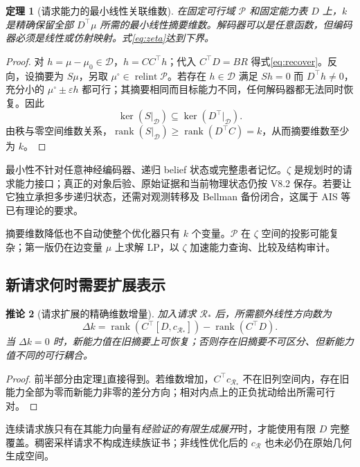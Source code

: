 \documentclass[UTF8,11pt,a4paper,fontset=fandol]{ctexart}
\numberwithin{equation}{section}
\newtheorem{theorem}{定理}[section]
\newtheorem{corollary}[theorem]{推论}
\theoremstyle{definition}
\DeclareMathOperator{\rank}{rank}
\begin{document}
\begin{theorem}[请求能力的最小线性关联维数]
\label{thm:minsummary}
在固定可行域 $\mathcal P$ 和固定能力表 $D$ 上，$k$ 是精确保留全部 $D^\top\mu$ 所需的最小线性摘要维数。解码器可以是任意函数，但编码器必须是线性或仿射映射。式\eqref{eq:zeta}达到下界。
\end{theorem}
\begin{proof}
对 $h=\mu-\mu_0\in\mathcal D$，$h=CC^\top h$；代入 $C^\top D=BR$ 得式\eqref{eq:recover}。反向，设摘要为 $S\mu$，另取 $\mu^\circ\in\operatorname{relint}\mathcal P$。若存在 $h\in\mathcal D$ 满足 $Sh=0$ 而 $D^\top h\ne0$，充分小的 $\mu^\circ\pm\varepsilon h$ 都可行；其摘要相同而目标能力不同，任何解码器都无法同时恢复。因此
\[
\ker(S|_{\mathcal D})\subseteq\ker(D^\top|_{\mathcal D}).
\]
由秩与零空间维数关系，$\rank(S|_{\mathcal D})\ge\rank(D^\top C)=k$，从而摘要维数至少为 $k$。\end{proof}

最小性不针对任意神经编码器、递归 belief 状态或完整患者记忆。$\zeta$ 是规划时的请求能力接口；真正的对象后验、原始证据和当前物理状态仍按 V8.2 保存。若要让它独立承担多步递归状态，还需对观测转移及 Bellman 备份闭合，这属于 AIS 等已有理论的要求\cite{ais,constrainedais}。

摘要维数降低也不自动使整个优化器只有 $k$ 个变量。$\mathcal P$ 在 $\zeta$ 空间的投影可能复杂；第一版仍在边变量 $\mu$ 上求解 LP，以 $\zeta$ 加速能力查询、比较及结构审计。

\subsection{新请求何时需要扩展表示}
\begin{corollary}[请求扩展的精确维数增量]
\label{cor:upgrade}
加入请求 $\mathcal R_*$ 后，所需额外线性方向数为
\begin{equation}
\Delta k=\rank\!\left(C^\top[D,c_{\mathcal R_*}]\right)
-\rank(C^\top D).
\label{eq:upgrade}
\end{equation}
当 $\Delta k=0$ 时，新能力值在旧摘要上可恢复；否则存在旧摘要不可区分、但新能力值不同的可行耦合。
\end{corollary}
\begin{proof}
前半部分由定理\ref{thm:minsummary}直接得到。若维数增加，$C^\top c_{\mathcal R_*}$ 不在旧列空间内，存在旧能力全部为零而新能力非零的差分方向；相对内点上的正负扰动给出所需可行对。\end{proof}

连续请求族只有在其能力向量有\emph{经验证的有限生成展开}时，才能使用有限 $D$ 完整覆盖。稠密采样请求不构成连续族证书；非线性优化后的 $c_{\mathcal R}$ 也未必仍在原始几何生成空间。
\end{document}

